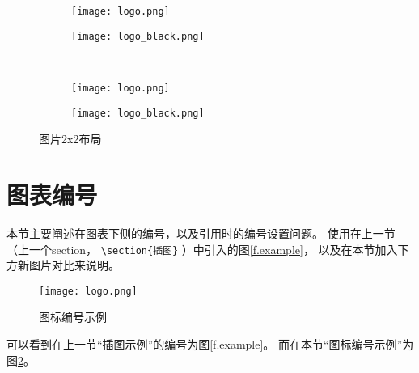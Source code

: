\begin{figure}[!htb]
    \centering
    \begin{subfigure}[t]{0.3\linewidth}
        \captionsetup{justification=centering}
        \begin{minipage}[b]{1\linewidth}
            \centering
            \texttt{[image: logo.png]}
            \caption{}
        \end{minipage}
    \end{subfigure}
    \hspace{-5em}
    \begin{subfigure}[t]{0.3\linewidth}
        \captionsetup{justification=centering}
        \begin{minipage}[b]{1\linewidth}
            \centering
            \texttt{[image: logo\_black.png]}
            \caption{}
        \end{minipage}
    \end{subfigure}\\
    \begin{subfigure}[t]{0.3\linewidth}
        \captionsetup{justification=centering}
        \begin{minipage}[b]{1\linewidth}
            \centering
            \texttt{[image: logo.png]}
            \caption{}
        \end{minipage}
    \end{subfigure}
    \hspace{-5em}
    \begin{subfigure}[t]{0.3\linewidth}
        \captionsetup{justification=centering}
        \begin{minipage}[b]{1\linewidth}
            \centering
            \texttt{[image: logo\_black.png]}
            \caption{}
        \end{minipage}
    \end{subfigure}
    \caption{图片2x2布局}
    \label{f.csu_2x2}
\end{figure}

\newpage

\section{图表编号}

本节主要阐述在图表下侧的编号，以及引用时的编号设置问题。
使用在上一节（上一个section， \verb|\section{插图}| ）中引入的图\ref{f.example}，
以及在本节加入下方新图片对比来说明。

\begin{figure}[hbt]
    \centering
    \texttt{[image: logo.png]}
    \caption{图标编号示例}
    \label{f.example.2}
\end{figure}

可以看到在上一节“插图示例”的编号为图\ref{f.example}。
而在本节“图标编号示例”为图\ref{f.example.2}。
